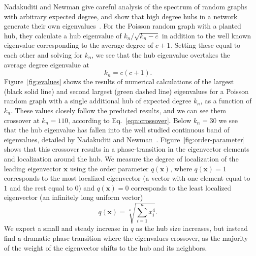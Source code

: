 \documentclass[twocolumn,prl,superscriptaddress]{revtex4}
\renewcommand{\vec}{\mathbf}
\begin{document}
Nadakuditi and Newman give careful analysis of the spectrum of random graphs with arbitrary expected degree, and show that high degree hubs in a network generate their own eigenvalues~\cite{nadakuditi13}. For the Poisson random graph with a planted hub, they calculate a hub eigenvalue of $k_n / \sqrt{k_n - c}$ in addition to the well known eigenvalue corresponding to the average degree of $c+1$. Setting these equal to each other and solving for $k_n$, we see that the hub eigenvalue overtakes the average degree eigenvalue at
\begin{equation}
k_n = c(c+1).
\label{eqn:crossover}
\end{equation}
Figure~\ref{fig:evalues} shows the results of numerical calculations of the largest (black solid line) and second largest (green dashed line) eigenvalues for a Poisson random graph with a single additional hub of expected degree $k_n$, as a function of $k_n$. These values closely follow the predicted results, and we can see them crossover at $k_n = 110$, according to Eq.~\ref{eqn:crossover}. Below $k_n = 30$ we see that the hub eigenvalue has fallen into the well studied continuous band of eigenvalues, detailed by Nadakuditi and Newman~\cite{nadakuditi13}. Figure~\ref{fig:order-parameter} shows that this crossover results in a phase-transition in the eigenvector elements and localization around the hub. We measure the degree of localization of the leading eigenvector $\vec{x}$ using the order parameter $q(\vec{x})$, where $q(\vec{x}) = 1$ corresponds to the most localized eigenvector (a vector with one element equal to $1$ and the rest equal to $0$) and $q(\vec{x}) = 0$ corresponds to the least localized eigenvector (an infinitely long uniform vector)
\begin{equation}
q(\vec{x}) = \sqrt[4]{\sum_{i=1}^n x_i ^ 4}.
\label{eqn:op}
\end{equation}
We expect a small and steady increase in $q$ as the hub size increases, but instead find a dramatic phase transition where the eigenvalues crossover, as the majority of the weight of the eigenvector shifts to the hub and its neighbors.
\end{document}
